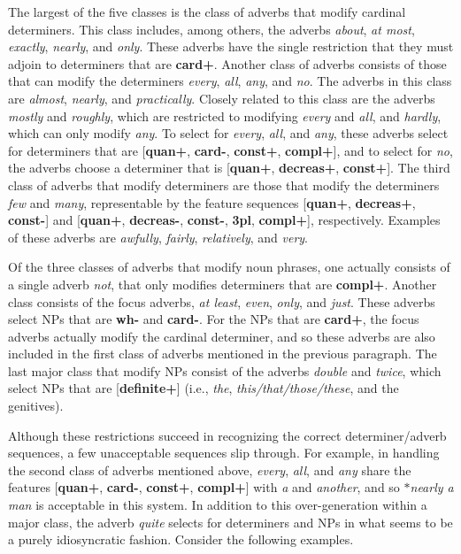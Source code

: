 The largest of the five classes is the class of adverbs that modify cardinal
determiners.  This class includes, among others, the adverbs {\it about}, {\it
at most}, {\it exactly}, {\it nearly}, and {\it only}.  These adverbs have the
single restriction that they must adjoin to determiners that are {\bf card+}.
Another class of adverbs consists of those that can modify the determiners {\it
every}, {\it all}, {\it any}, and {\it no}.  The adverbs in this class are {\it
almost}, {\it nearly}, and {\it practically}.  Closely related to this class
are the adverbs {\it mostly} and {\it roughly}, which are restricted to
modifying {\it every} and {\it all}, and {\it hardly}, which can only modify
{\it any}.  To select for {\it every}, {\it all}, and {\it any}, these adverbs
select for determiners that are [{\bf quan+}, {\bf card-}, {\bf const+}, {\bf
compl+}], and to select for {\it no}, the adverbs choose a determiner that is
[{\bf quan+}, {\bf decreas+}, {\bf const+}].  The third class of adverbs that
modify determiners are those that modify the determiners {\it few} and {\it
many}, representable by the feature sequences [{\bf quan+}, {\bf decreas+},
{\bf const-}] and [{\bf quan+}, {\bf decreas-}, {\bf const-}, {\bf 3pl}, {\bf
compl+}], respectively.  Examples of these adverbs are {\it awfully}, {\it
fairly}, {\it relatively}, and {\it very}.

Of the three classes of adverbs that modify noun phrases, one actually consists
of a single adverb {\it not}, that only modifies determiners that are {\bf
compl+}.  Another class consists of the focus adverbs, {\it at least}, {\it
even}, {\it only}, and {\it just}.  These adverbs select NPs that are {\bf wh-}
and {\bf card-}.  For the NPs that are {\bf card+}, the focus adverbs actually
modify the cardinal determiner, and so these adverbs are also included in the
first class of adverbs mentioned in the previous paragraph.  The last major
class that modify NPs consist of the adverbs {\it double} and {\it twice},
which select NPs that are [{\bf definite+}] (i.e., {\it the}, {\it
this/that/those/these}, and the genitives).

Although these restrictions succeed in recognizing the correct
determiner/adverb sequences, a few unacceptable sequences slip through.  For
example, in handling the second class of adverbs mentioned above, {\it every},
{\it all}, and {\it any} share the features [{\bf quan+}, {\bf card-}, {\bf
const+}, {\bf compl+}] with {\it a} and {\it another}, and so {\it
$\ast$nearly a man} is acceptable in this system.  In addition to this
over-generation within a major class, the adverb {\it quite} selects for
determiners and NPs in what seems to be a purely idiosyncratic fashion.
Consider the following examples.

